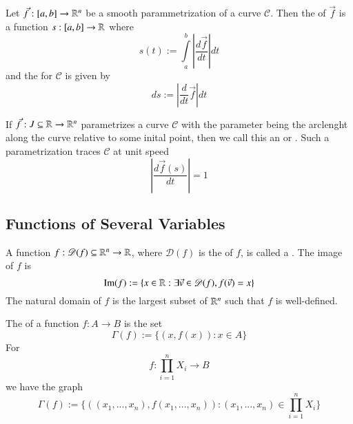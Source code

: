 \documentclass[12pt]{report}
\begin{document}
\begin{appendices}
    \begin{defn}{}{}
        Let $\vec{f}:[a,b] \rightarrow \mathbb R^n$ be a smooth parammetrization of a curve $\mathscr{C}$. Then the  of $\vec{f}$ is a function $s:[a,b] \rightarrow \mathbb R$ where \begin{equation}
            s(t) := \int\limits_a^b\left|\frac{d\vec{f}}{dt}\right|dt
        \end{equation}
        and the  for $\mathscr{C}$ is given by \begin{equation}
            ds := \left|\frac{d}{dt}\vec{f}\right|dt
        \end{equation}
    \end{defn}

    \begin{defn}{}{}
        If $\vec{f}:J\subseteq \mathbb R\rightarrow \mathbb R^n$ parametrizes a curve $\mathscr{C}$ with the parameter being the arclenght along the curve relative to some inital point, then we call this an  or . Such a parametrization traces $\mathscr{C}$ at unit speed \begin{equation}
            \left|\frac{d\vec{f}(s)}{dt}\right| = 1
        \end{equation}
    \end{defn}


    \subsection{Functions of Several Variables}

    \begin{defn}{}{}
        A function $f:\mathscr{D}(f) \subseteq \mathbb R^n\rightarrow \mathbb R$, where $\mathscr{D}(f)$ is the  of $f$, is called a . The image of $f$ is \begin{equation}
            \operatorname{Im}(f):=\{x \in \mathbb R:\exists\vec{v} \in \mathscr{D}(f), f(\vec{v}) = x\}
        \end{equation}
        The natural domain of $f$ is the largest subset of $\mathbb R^n$ such that $f$ is well-defined.
    \end{defn}

    
    \begin{defn}{}{}
        The  of a function $f:A\rightarrow B$ is the set \begin{equation}
            \Gamma(f):=\{(x,f(x)):x \in A\}
        \end{equation}
        For \begin{equation}
            f:\prod\limits_{i=1}^nX_i\rightarrow B
        \end{equation}
        we have the graph \begin{equation}
            \Gamma(f):= \{((x_1,...,x_n),f(x_1,...,x_n)):(x_1,...,x_n) \in \prod\limits_{i=1}^nX_i\}
        \end{equation}
    \end{defn}


\end{appendices}
\end{document}
